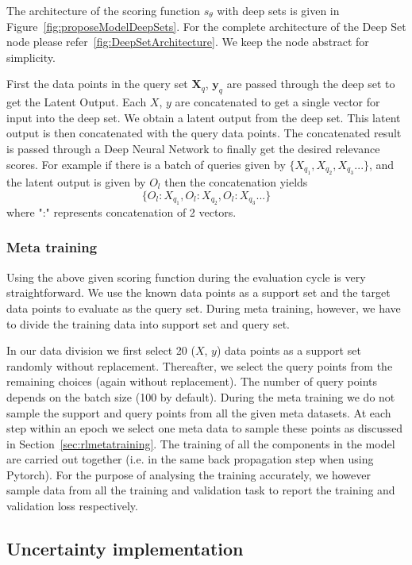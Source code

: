 \documentclass[12pt, twoside, ngerman]{report}
\begin{document}
The  architecture of the scoring function $s_{\theta}$ with deep sets is given in Figure~\ref{fig:proposeModelDeepSets}.
For the complete architecture of the Deep Set node please refer~\ref{fig:DeepSetArchitecture}.
We keep the node abstract for simplicity.\

First the data points in the query set $\textbf{X}_q$, $\textbf{y}_q$ are passed through the deep set to get the Latent Output.
Each $X$, $y$ are concatenated to get a single vector for input into the deep set.
We obtain a latent output from the deep set.
This latent output is then concatenated with the query data points.
The concatenated result is passed through a Deep Neural Network to finally get the desired relevance scores.
For example if there is a batch of queries given by $\{X_{q_1},  X_{q_2},  X_{q_3} ...\}$,  and the latent output is given by $O_l$ then the concatenation yields
$$
\{O_l:X_{q_1},  O_l:X_{q_2},  O_l:X_{q_3} ...\}
$$
where ":" represents concatenation of 2 vectors.

\subsubsection{Meta training}

Using the above given scoring function during the evaluation cycle is very straightforward.
We use the known data points as a support set and the target data points to evaluate as the query set.
During meta training,  however,  we have to divide the training data into support set and query set.

In our data division we first select 20 ($X$, $y$) data points as a support set randomly without replacement.
Thereafter,  we select the query points from the remaining choices (again without replacement). The number of query points depends on the batch size (100 by default).
During the meta training we do not sample the support and query points from all the given meta datasets.
At each step within an epoch we select one meta data to sample these points as discussed in Section~\ref{sec:rlmetatraining}.
The training of all the components in the model are carried out together (i.e. in the same back propagation step when using Pytorch).
For the purpose of analysing the training accurately,  we however sample data from all the training and validation task to report the training and validation loss respectively.

\subsection{Uncertainty implementation}\label{sec:UncertaintyImplementation}
\end{document}
